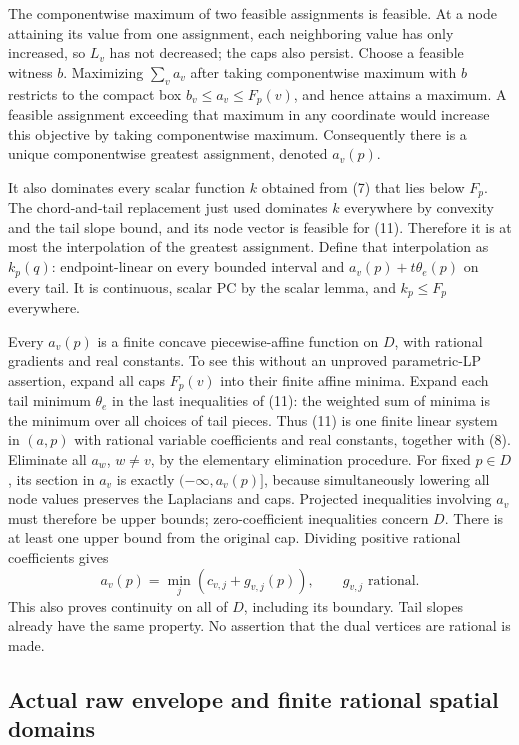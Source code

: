 \documentclass[
  11pt,
]{article}
\begin{document}
The componentwise maximum of two feasible assignments is feasible. At a
node attaining its value from one assignment, each neighboring value has
only increased, so \(L_v\) has not decreased; the caps also persist.
Choose a feasible witness \(b\). Maximizing \(\sum_v a_v\) after taking
componentwise maximum with \(b\) restricts to the compact box
\(b_v\leq a_v\leq F_p(v)\), and hence attains a maximum. A feasible
assignment exceeding that maximum in any coordinate would increase this
objective by taking componentwise maximum. Consequently there is a
unique componentwise greatest assignment, denoted \(a_v(p)\).

It also dominates every scalar function \(k\) obtained from (7) that
lies below \(F_p\). The chord-and-tail replacement just used dominates
\(k\) everywhere by convexity and the tail slope bound, and its node
vector is feasible for (11). Therefore it is at most the interpolation
of the greatest assignment. Define that interpolation as \(k_p(q)\):
endpoint-linear on every bounded interval and \(a_v(p)+t\theta_e(p)\) on
every tail. It is continuous, scalar PC by the scalar lemma, and
\(k_p\leq F_p\) everywhere.

Every \(a_v(p)\) is a finite concave piecewise-affine function on \(D\),
with rational gradients and real constants. To see this without an
unproved parametric-LP assertion, expand all caps \(F_p(v)\) into their
finite affine minima. Expand each tail minimum \(\theta_e\) in the last
inequalities of (11): the weighted sum of minima is the minimum over all
choices of tail pieces. Thus (11) is one finite linear system in
\((a,p)\) with rational variable coefficients and real constants,
together with (8). Eliminate all \(a_w\), \(w\ne v\), by the elementary
elimination procedure. For fixed \(p\in D\), its section in \(a_v\) is
exactly \((-\infty,a_v(p)]\), because simultaneously lowering all node
values preserves the Laplacians and caps. Projected inequalities
involving \(a_v\) must therefore be upper bounds; zero-coefficient
inequalities concern \(D\). There is at least one upper bound from the
original cap. Dividing positive rational coefficients gives \[
 a_v(p)=\min_j(c_{v,j}+g_{v,j}(p)),\qquad g_{v,j}\text{ rational}.             \tag{12}
\] This also proves continuity on all of \(D\), including its boundary.
Tail slopes already have the same property. No assertion that the dual
vertices are rational is made.

\subsection{Actual raw envelope and finite rational spatial
domains}\label{actual-raw-envelope-and-finite-rational-spatial-domains}
\end{document}
